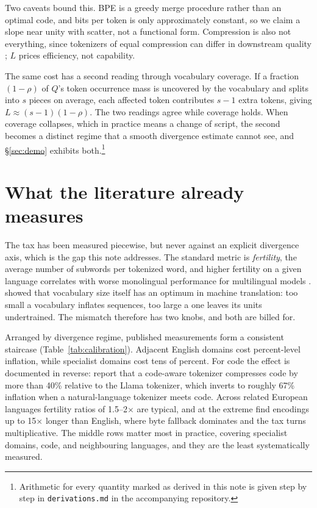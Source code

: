 \documentclass{article}
\begin{document}
Two caveats bound this. BPE is a greedy merge procedure rather than an optimal code, and bits per token is only approximately constant, so we claim a slope near unity with scatter, not a functional form. Compression is also not everything, since tokenizers of equal compression can differ in downstream quality \citep{schmidt2024tokenization}; $L$ prices efficiency, not capability.

The same cost has a second reading through vocabulary coverage. If a fraction $(1-\rho)$ of $Q$'s token occurrence mass is uncovered by the vocabulary and splits into $s$ pieces on average, each affected token contributes $s-1$ extra tokens, giving $L \approx (s-1)(1-\rho)$. The two readings agree while coverage holds. When coverage collapses, which in practice means a change of script, the second becomes a distinct regime that a smooth divergence estimate cannot see, and \S\ref{sec:demo} exhibits both.\footnote{Arithmetic for every quantity marked as derived in this note is given step by step in \texttt{derivations.md} in the accompanying repository.}

\section{What the literature already measures}
\label{sec:lit}

The tax has been measured piecewise, but never against an explicit divergence axis, which is the gap this note addresses. The standard metric is \emph{fertility}, the average number of subwords per tokenized word, and higher fertility on a given language correlates with worse monolingual performance for multilingual models \citep{rust2021tokenizer}. \citet{gowda2020finding} showed that vocabulary size itself has an optimum in machine translation: too small a vocabulary inflates sequences, too large a one leaves its units undertrained. The mismatch therefore has two knobs, and both are billed for.

Arranged by divergence regime, published measurements form a consistent staircase (Table~\ref{tab:calibration}). Adjacent English domains cost percent-level inflation, while specialist domains cost tens of percent. For code the effect is documented in reverse: \citet{dagan2024tokenizer} report that a code-aware tokenizer compresses code by more than 40\% relative to the Llama tokenizer, which inverts to roughly 67\% inflation when a natural-language tokenizer meets code. Across related European languages fertility ratios of 1.5--2$\times$ are typical, and at the extreme \citet{petrov2023language} find encodings up to 15$\times$ longer than English, where byte fallback dominates and the tax turns multiplicative. The middle rows matter most in practice, covering specialist domains, code, and neighbouring languages, and they are the least systematically measured.
\end{document}
